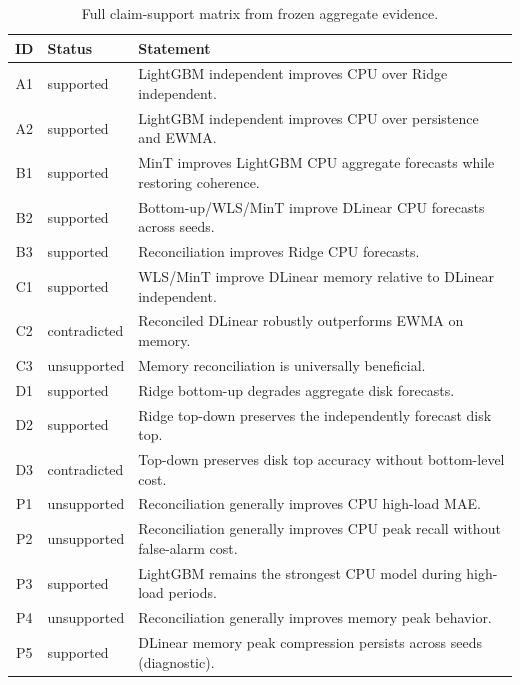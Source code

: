 \begin{table}[t]
\centering
\caption{Full claim-support matrix from frozen aggregate evidence.}
\label{tab:claim_support_full}
\scriptsize
\begin{tabular}{@{}clp{8cm}@{}}
\toprule
ID & Status & Statement \\
\midrule

A1 & supported & LightGBM independent improves CPU over Ridge independent. \\
A2 & supported & LightGBM independent improves CPU over persistence and EWMA. \\
B1 & supported & MinT improves LightGBM CPU aggregate forecasts while restoring coherence. \\
B2 & supported & Bottom-up/WLS/MinT improve DLinear CPU forecasts across seeds. \\
B3 & supported & Reconciliation improves Ridge CPU forecasts. \\
C1 & supported & WLS/MinT improve DLinear memory relative to DLinear independent. \\
C2 & contradicted & Reconciled DLinear robustly outperforms EWMA on memory. \\
C3 & unsupported & Memory reconciliation is universally beneficial. \\
D1 & supported & Ridge bottom-up degrades aggregate disk forecasts. \\
D2 & supported & Ridge top-down preserves the independently forecast disk top. \\
D3 & contradicted & Top-down preserves disk top accuracy without bottom-level cost. \\
P1 & unsupported & Reconciliation generally improves CPU high-load MAE. \\
P2 & unsupported & Reconciliation generally improves CPU peak recall without false-alarm cost. \\
P3 & supported & LightGBM remains the strongest CPU model during high-load periods. \\
P4 & unsupported & Reconciliation generally improves memory peak behavior. \\
P5 & supported & DLinear memory peak compression persists across seeds (diagnostic). \\
\bottomrule
\end{tabular}
\end{table}
